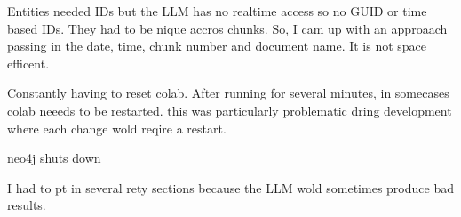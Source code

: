 Entities needed IDs but the LLM has no realtime access so no GUID or time based IDs. They had to be nique accros chunks. So, I cam up with an approaach passing in the date, time, chunk number and document name. It is not space efficent.

Constantly having to reset colab. After running for several minutes, in somecases colab neeeds to be restarted. this was particularly problematic dring development where each change wold reqire a restart.

neo4j shuts down

I had to pt in several rety sections because the LLM wold sometimes produce bad results.